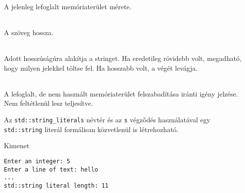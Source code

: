 \begin{frame}
    \begin{description}[m]
        \item[\hiv{\href{https://en.cppreference.com/w/cpp/string/basic_string/capacity}{\texttt{capacity()}}}] \hfill \\ A jelenleg lefoglalt memóriaterület mérete.
        \item[\hiv{\href{https://en.cppreference.com/w/cpp/string/basic_string/size}{\texttt{length()}}}] \hfill \\ A szöveg hossza.
        \item[\hiv{\href{https://en.cppreference.com/w/cpp/string/basic_string/resize}{\texttt{resize()}}}] \hfill \\ Adott hosszúságúra alakítja a stringet. Ha eredetileg rövidebb volt, megadható, hogy milyen jelekkel töltse fel. Ha hosszabb volt, a végét levágja.
        \item[\hiv{\href{https://en.cppreference.com/w/cpp/string/basic_string/shrink_to_fit}{\texttt{shrink\_to\_fit()}}}] \hfill \\ A lefoglalt, de nem használt memóriaterület felszabadítása iránti igény jelzése. Nem feltétlenül lesz teljesítve.
    \end{description}
\end{frame}

\begin{frame}[fragile]
    \begin{exampleblock}{}
        \footnotesize
        
    \end{exampleblock}
    \small
    Az \texttt{std::string\_literals} névtér és az \texttt{s} végződés használatával egy \texttt{std::string} literál formálisan közvetlenül is létrehozható.
    \begin{block}{Kimenet}
        \vspace{-.4cm}
        \footnotesize
        \begin{verbatim}
Enter an integer: 5
Enter a line of text: hello
...
std::string literal length: 11
\end{verbatim}
        \vspace{-.3cm}
    \end{block}
\end{frame}

\begin{frame}
    \begin{exampleblock}{}
        \scriptsize
        
    \end{exampleblock}
\end{frame}

